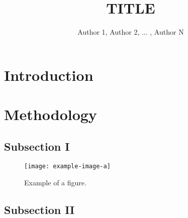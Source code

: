 \documentclass[isoft]{ssltexposter}
\title{\uppercase{TITLE}}
\author{Author 1, Author 2, ... , Author N}
\begin{document}
    \begin{poster}
    
    \begin{abstract}
        \normalsize
        
        \lipsum[57]
        
    \end{abstract}
    
    \section{Introduction}
    
        \lipsum[57]
        
    \section{Methodology}%
        
        \subsection{Subsection I}
        
        \lipsum[57]
        
        \vspace{1cm}
        
        \begin{figure}
            \centering
            \captionsetup{type=figure}
            \texttt{[image: example-image-a]}
            \caption{Example of a figure.}
            \label{fig:lstm}
        \end{figure}
        
        \subsection{Subsection II}
        
            \lipsum[57]
            

\end{poster}
\end{document}
